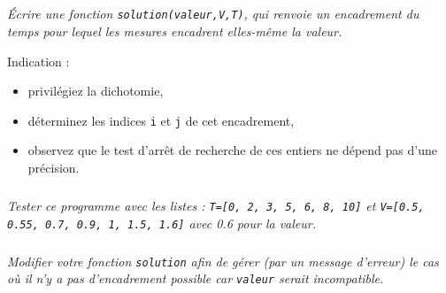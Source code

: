 \begin{multicols}{2}
\subparagraph{}\textit{Écrire une fonction \texttt{solution(valeur,V,T)}, qui renvoie un
encadrement du temps pour lequel les mesures encadrent elles-même la valeur.}

Indication :
\begin{itemize}
\item privilégiez la dichotomie,
\item déterminez les indices \texttt{i} et \texttt{j} de cet encadrement,
\item observez que le test d'arrêt de recherche de ces entiers ne dépend pas d'une précision.
\end{itemize}

\subparagraph{}\textit{Tester ce programme avec les listes : \texttt{T=[0, 2, 3, 5, 6, 8, 10]} et \texttt{V=[0.5, 0.55, 0.7, 0.9, 1, 1.5, 1.6]} avec 0.6  pour la valeur.}

\subparagraph{}\textit{Modifier votre fonction \texttt{solution} afin de gérer (par un message d'erreur) le cas où il n'y a pas d'encadrement possible car \texttt{valeur} serait incompatible.}

\end{multicols}




